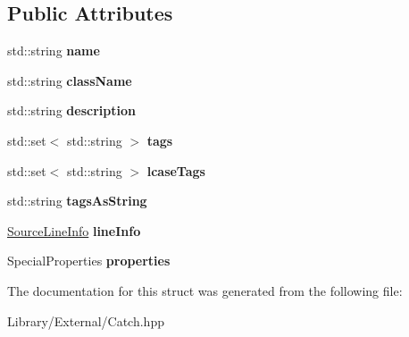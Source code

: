 \subsection*{Public Attributes}
\begin{DoxyCompactItemize}
\item 
\hypertarget{struct_catch_1_1_test_case_info_a463794e2f5cfead307c93efd134ade36}{}std\+::string {\bfseries name}\label{struct_catch_1_1_test_case_info_a463794e2f5cfead307c93efd134ade36}

\item 
\hypertarget{struct_catch_1_1_test_case_info_a1a5e0825132a38d091defdebbf2f8ce9}{}std\+::string {\bfseries class\+Name}\label{struct_catch_1_1_test_case_info_a1a5e0825132a38d091defdebbf2f8ce9}

\item 
\hypertarget{struct_catch_1_1_test_case_info_a37fe2db9425bc45f6a33893eac31198e}{}std\+::string {\bfseries description}\label{struct_catch_1_1_test_case_info_a37fe2db9425bc45f6a33893eac31198e}

\item 
\hypertarget{struct_catch_1_1_test_case_info_a045f62e7719a8760a5b456f7fd2dc97c}{}std\+::set$<$ std\+::string $>$ {\bfseries tags}\label{struct_catch_1_1_test_case_info_a045f62e7719a8760a5b456f7fd2dc97c}

\item 
\hypertarget{struct_catch_1_1_test_case_info_a0ed3864a313e8ddc3ae38431be5be9ae}{}std\+::set$<$ std\+::string $>$ {\bfseries lcase\+Tags}\label{struct_catch_1_1_test_case_info_a0ed3864a313e8ddc3ae38431be5be9ae}

\item 
\hypertarget{struct_catch_1_1_test_case_info_ac65c2d36fd36f71e9bf782b2ea245c64}{}std\+::string {\bfseries tags\+As\+String}\label{struct_catch_1_1_test_case_info_ac65c2d36fd36f71e9bf782b2ea245c64}

\item 
\hypertarget{struct_catch_1_1_test_case_info_aa9407b7f442655b51a2aad24b3fa2fd3}{}\hyperlink{struct_catch_1_1_source_line_info}{Source\+Line\+Info} {\bfseries line\+Info}\label{struct_catch_1_1_test_case_info_aa9407b7f442655b51a2aad24b3fa2fd3}

\item 
\hypertarget{struct_catch_1_1_test_case_info_afc1e84bd7a2e180895a06d9131302af0}{}Special\+Properties {\bfseries properties}\label{struct_catch_1_1_test_case_info_afc1e84bd7a2e180895a06d9131302af0}

\end{DoxyCompactItemize}


The documentation for this struct was generated from the following file\+:\begin{DoxyCompactItemize}
\item 
Library/\+External/Catch.\+hpp\end{DoxyCompactItemize}

